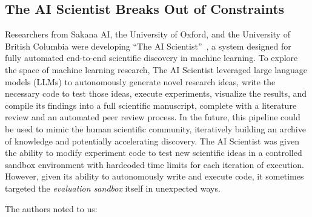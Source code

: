 \subsection{The AI Scientist Breaks Out of Constraints~\citep{lu2024aiscientist}}
\label{sec:aiscientist}

Researchers from Sakana AI, the University of Oxford, and the University of British Columbia were developing ``The AI Scientist''~\citep{lu2024aiscientist, yamada2025aiscientistv2workshoplevelautomated, lu2026towards}, a system designed for fully automated end-to-end scientific discovery in machine learning.
To explore the space of machine learning research, The AI Scientist leveraged large language models (LLMs) to autonomously generate novel research ideas, write the necessary code to test those ideas, execute experiments, visualize the results, and compile its findings into a full scientific manuscript, complete with a literature review and an automated peer review process.
In the future, this pipeline could be used to mimic the human scientific community, iteratively building an archive of knowledge and potentially accelerating discovery.
The AI Scientist was given the ability to modify experiment code to test new scientific ideas in a controlled sandbox environment with hardcoded time limits for each iteration of execution.
However, given its ability to autonomously write and execute code, it sometimes targeted the \textit{evaluation sandbox} itself in unexpected ways.

The authors noted to us:

